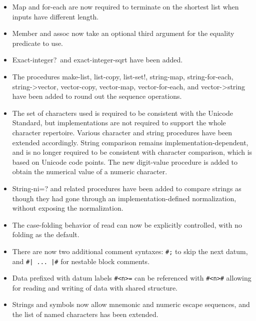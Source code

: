 \begin{itemize}
\item {\cf Map} and {\cf for-each} are now required to terminate on
the shortest list when inputs have different length.

\item {\cf Member} and {\cf assoc} now take an optional third argument
for the equality predicate to use.

\item {\cf Exact-integer?}\  and {\cf exact-integer-sqrt} have been added.

\item The procedures {\cf make-list}, {\cf list-copy}, {\cf list-set!}, {\cf
string-map}, {\cf string-for-each}, {\cf string->vector}, {\cf
vector-copy}, {\cf vector-map}, {\cf vector-for-each}, and {\cf
vector->string} have been added to round out the sequence operations.

\item The set of characters used is required to be consistent with the
Unicode Standard, 
but implementations are not required to support the whole character repertoire.
Various character and string procedures have been extended accordingly.
String comparison remains implementation-dependent, and is no longer
required to be consistent with character comparison, which is based
on Unicode code points.
The new {\cf digit-value} procedure is added to obtain the numerical
value of a numeric character.

\item {\cf String-ni=?} and related procedures have been added to
compare strings as though they had gone through an
implementation-defined normalization, without exposing the
normalization.

\item The case-folding behavior of {\cf read} can now be explicitly
controlled, with no folding as the default.

\item There are now two additional comment syntaxes: {\tt \#;} to
skip the next datum, and {\tt \#| ... |\#}
for nestable block comments.

\item Data prefixed with datum labels {\tt \#<n>=} can be referenced
with {\tt \#<n>\#} allowing for reading and writing of data with
shared structure.

\item Strings and symbols now allow mnemonic and numeric escape
sequences, and the list of named characters has been extended.


\end{itemize}
